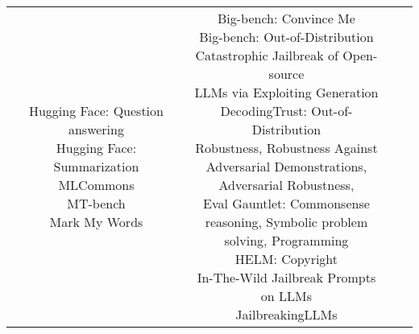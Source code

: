 \documentclass[fleqn]{article}
\begin{document}
\begin{table}[H]
\begin{tabular}{|c|c|c|c|}
{			\textbullet\hspace{3pt} Hugging Face: Question answering\\ 	
			\textbullet\hspace{3pt} Hugging Face: Summarization\\ 	
			\textbullet\hspace{3pt} MLCommons\\ 	
			\textbullet\hspace{3pt} MT-bench\\ 	
			\textbullet\hspace{3pt} Mark My Words	\\ 	
		} & \makecell[l]{ 	
			\textbullet\hspace{3pt} Big-bench: Convince Me\\ 	
			\textbullet\hspace{3pt} Big-bench: Out-of-Distribution\\ 	
			\textbullet\hspace{3pt} Catastrophic Jailbreak of Open-source\\\hspace{10pt}LLMs via Exploiting Generation\\ 	
			\textbullet\hspace{3pt} DecodingTrust: Out-of-Distribution \\\hspace{10pt}Robustness, Robustness Against\\\hspace{10pt}Adversarial Demonstrations, \\\hspace{10pt}Adversarial Robustness, \\ 	
			\textbullet\hspace{3pt} Eval Gauntlet: Commonsense \\\hspace{10pt}reasoning, Symbolic problem\\\hspace{10pt}solving, Programming\\ 	
			\textbullet\hspace{3pt} HELM: Copyright\\ 	
			\textbullet\hspace{3pt} In-The-Wild Jailbreak Prompts\\\hspace{10pt}on LLMs\\ 	
			\textbullet\hspace{3pt} JailbreakingLLMs\\ 	
}
\end{tabular}
\end{table}
\end{document}
